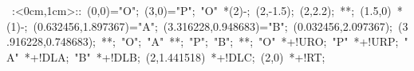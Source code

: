 %


\hbox{
\xy    <1cm,0cm>:<0cm,1cm>::
       (0,0)="O"; (3,0)="P"; "O" *\ellipse(2){-};   
       (2,-1.5); (2,2.2); **\dir{-};
       (1.5,0)  *\ellipse(1){-};
       (0.632456,1.897367)="A";   (3.316228,0.948683)="B";
       (0.032456,2.097367); (3.916228,0.748683); **\dir{-};
       "O"; "A" **\dir{-}; "P"; "B"; **\dir{-};
       "O" *+!UR{O}; "P" *+!UR{P}; "A" *+!DL{A}; "B" *+!DL{B}; 
       (2,1.441518) *+!DL{C}; (2,0) *+!R{T};
\endxy}

